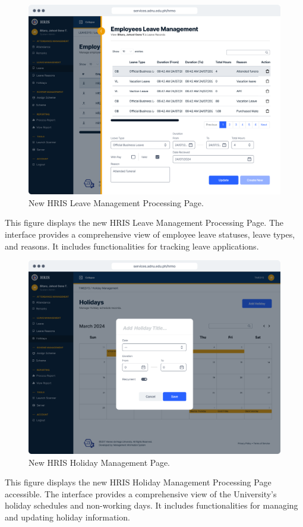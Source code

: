     \begin{figure}[H]
        \centering
        \includegraphics[width=1\linewidth]{figures/app/leave-mgt.png}
        \caption{New HRIS Leave Management Processing Page.}
        \label{fig:leave-mgt}
    \end{figure}

    This figure displays the new HRIS Leave Management Processing Page. The interface provides a comprehensive view of employee leave statuses, leave types, and reasons. It includes functionalities for tracking leave applications.

    \begin{figure}[H]
        \centering
        \includegraphics[width=1\linewidth]{figures/app/holiday.png}
        \caption{New HRIS Holiday Management Page.}
        \label{fig:holiday}
    \end{figure}

    This figure displays the new HRIS Holiday Management Processing Page accessible. The interface provides a comprehensive view of the University's holiday schedules and non-working days. It includes functionalities for managing and updating holiday information.